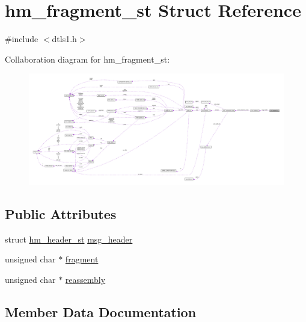 \hypertarget{structhm__fragment__st}{}\section{hm\+\_\+fragment\+\_\+st Struct Reference}
\label{structhm__fragment__st}


{\ttfamily \#include $<$dtls1.\+h$>$}



Collaboration diagram for hm\+\_\+fragment\+\_\+st\+:
\nopagebreak
\begin{figure}[H]
\begin{center}
\leavevmode
\includegraphics[width=350pt]{structhm__fragment__st__coll__graph}
\end{center}
\end{figure}
\subsection*{Public Attributes}
\begin{DoxyCompactItemize}
\item 
struct \hyperlink{structhm__header__st}{hm\+\_\+header\+\_\+st} \hyperlink{structhm__fragment__st_a171c5cb6c7c15bdf7c6401d022247729}{msg\+\_\+header}
\item 
unsigned char $\ast$ \hyperlink{structhm__fragment__st_ab36bd817673b28cc64b927b62faf7225}{fragment}
\item 
unsigned char $\ast$ \hyperlink{structhm__fragment__st_a50a13bdc9997bc66cb7c578519413510}{reassembly}
\end{DoxyCompactItemize}


\subsection{Member Data Documentation}
